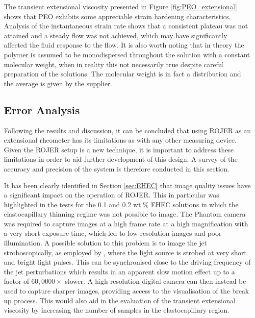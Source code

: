 \documentclass[11pt]{article}
\begin{document}
The transient extensional viscosity presented in Figure \ref{fig:PEO_extensional} shows that PEO exhibits some appreciable strain hardening characteristics. Analysis of the instantaneous strain rate shows that a consistent plateau was not attained and a steady flow was not achieved, which may have significantly affected the fluid response to the flow. It is also worth noting that in theory the polymer is assumed to be monodispersed throughout the solution with a constant molecular weight, when in reality this not necessarily true despite careful preparation of the solutions. The molecular weight is in fact a distribution and the average is given by the supplier.

\subsection{Error Analysis} \label{sec:error}
Following the results and discussion, it can be concluded that using ROJER as an extensional rheometer has its limitations as with any other measuring device. Given the ROJER setup is a new technique, it is important to address these limitations in order to aid further development of this design. A survey of the accuracy and precision of the system is therefore conducted in this section.

It has been clearly identified in Section \ref{sec:EHEC} that image quality issues have a significant impact on the operation of ROJER. This in particular was highlighted in the tests for the 0.1 and 0.2 wt.\% EHEC solutions in which the elastocapillary thinning regime was not possible to image. The Phantom camera was required to capture images at a high frame rate at a high magnification with a very short exposure time, which led to low resolution images and poor illumination. A possible solution to this problem is to image the jet stroboscopically, as employed by \cite{keshavarz2015studying}, where the light source is strobed at very short and bright light pulses. This can be synchronised close to the driving frequency of the jet perturbations which results in an apparent slow motion effect up to a factor of $60,0000 \times$ slower. A high resolution digital camera can then instead be used to capture sharper images, providing access to the visualisation of the break up process. This would also aid in the evaluation of the transient extensional viscosity by increasing the number of samples in the elastocapillary region.
\end{document}
